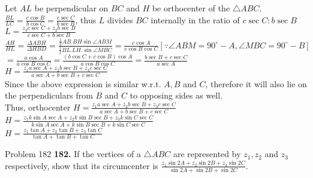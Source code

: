 \documentclass[aspectratio=169,8pt]{beamer}
\begin{document}
\begin{frame}
  Let $AL$ be perpendicular on $BC$ and $H$ be orthocenter of the $\triangle ABC$.\\
  \vspace*{0.2cm}
  $\frac{BL}{LC} = \frac{c\cos B}{b\cos C} = \frac{c\sec C}{b\sec B}$, thus $L$ divides $BC$ internally in the ratio of $c\sec
  C:b\sec B$\\
  $L = \frac{z_3c\sec C + z_2b\sec B}{c\sec C + b\sec B}$\\
  \vspace*{0.2cm}
  $\frac{AH}{HL} = \frac{\Delta ABH}{\Delta HBD} = \frac{\frac{1}{2}AB.BH\sin\angle ABM}{\frac{1}{2}BL.LH.\sin\angle MBC} = \frac{c\cos A}{c\cos B\cos C}[\because \angle ABM = 90^\circ - A, \angle MBC = 90^\circ - B]$\\
  $= \frac{a\cos A}{a\cos B\cos C} = \frac{(b\cos C + c\cos B)\cos A}{a\cos B\cos C} = \frac{b\sec B + c\sec C}{a\sec A}$\\
  \vspace*{0.2cm}
  $H = \frac{z_1a\sec A + z_2b\sec B + z_3c\sec C}{a\sec A + b\sec B + c\sec C}$\\
  \vspace*{0.2cm}
  Since the above expression is similar w.r.t. $A, B$ and $C$, therefore it will also lie on the perpendiculars from $B$ and $C$ to
  opposing sides as well.\\
  \vspace*{0.2cm}
  Thus, orthocenter $H = \frac{z_1a\sec A + z_2b\sec B + z_3c\sec C}{a\sec A + b\sec B + c\sec C}$\\
  \vspace*{0.2cm}
  $H = \frac{z_1k\sin A\sec A + z_2k\sin B\sec B + z_3k\sin C\sec C}{k\sin A\sec A + k\sin B\sec B + k\sin C\sec C}$\\
  \vspace*{0.2cm}
  $H = \frac{z_1\tan A + z_2\tan B + z_3\tan C}{\tan A + \tan B + \tan C}$
\end{frame}
\begin{frame}{Problem 182}
  \textbf{182.} If the vertices of a $\triangle ABC$ are represented by $z_1, z_2$ and $z_3$ respectively, show that its
  circumcenter is $\frac{z_1\sin 2A + z_2\sin 2B + z_3\sin 2C}{\sin 2A + \sin 2B + \sin 2C}$.
\end{frame}
\end{document}
